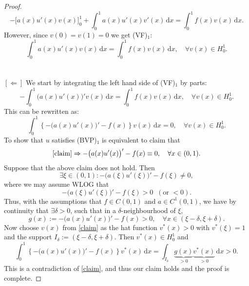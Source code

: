 \documentclass[12pt, a4paper]{article}
\newcommand{\rd}{\ensuremath{\mathrm{d}}}
\newcommand{\id}{\ensuremath{\,\rd}}
\numberwithin{equation}{section}
\begin{document}
\begin{proof}
\begin{equation*}
-\big[a(x)u'(x)v(x)\big]_0^1 + \int_0^1 a(x)u'(x)v'(x) \id x = \int_0^1 f(x)v(x) \id x.
\end{equation*}
However, since $v(0)=v(1)=0$ we get (VF)$_1$:
\begin{equation*}
\int_0^1 a(x)u'(x)v(x) \id x = \int_0^1 f(x)v(x) \id x, \quad \forall v(x)\in H_0^1.
\end{equation*}
\\\\
$[\Leftarrow ]$ We start by integrating the left hand side of (VF)$_1$ by parts:
\begin{equation*}
-\int_0^1 \big( a(x)u'(x) \big)' v(x) \id x = \int_0^1 f(x)v(x) \id x, \quad \forall v(x)\in H_0^1.
\end{equation*}
This can be rewritten as:
\begin{equation}
\label{claim}
\int_0^1 \left\{ -\big ( a(x)u'(x) \big )' - f(x) \right\} v(x) \id x = 0, \quad \forall v(x)\in H_0^1.
\end{equation}
To show that $u$ satisfies (BVP)$_1$ is equivalent to claim that 
\begin{equation*}
\text{\eqref{claim}} \Rightarrow -\big (a(x)u'(x)\big )' - f(x) \equiv 0, \quad \forall x\in(0,1).
\end{equation*}
Suppose that the above claim does not hold. Then
\begin{equation*}
\exists \xi \in (0,1) : -\big ( a(\xi)u'(\xi)\big )' -f(\xi) \neq 0,
\end{equation*}
where we may assume WLOG that 
\begin{equation*}
-\big ( a(\xi)u'(\xi) \big )' - f(\xi) > 0 \;\; (\text{or } <0).
\end{equation*}
Thus, with the assumptions that $f\in C(0,1)$ and $a\in C^1(0,1)$, we have by continuity that $\exists \delta >0$, such that in a $\delta$-neighbourhood of $\xi$,
\begin{equation*}
g(x) := -\big ( a(x)u'(x) \big )' -f(x) > 0, \quad \forall x\in (\xi-\delta,\xi+\delta).
\end{equation*}
Now choose $v(x)$ from \eqref{claim} as the hat function $v^*(x)>0$ with $v^*(\xi)=1$ and the support $I_\delta := (\xi-\delta,\xi+\delta)$. Then $v^*(x)\in H_0^1$ and
\begin{equation*}
\int_0^1 \left\{ -\big ( a(x)u'(x) \big )' - f(x) \right\} v^*(x) \id x = \int_{I_\delta} \underbrace{g(x)}_{>0}\underbrace{v^*(x)}_{>0}\id x>0.
\end{equation*}
This is a contradiction of \eqref{claim}, and thus our claim holds and the proof is complete.
\end{proof}
\end{document}

